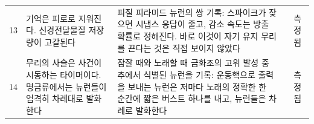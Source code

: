 {\begin{longtable}{>{\raggedright}p{0.5cm}>{\raggedright}p{4.0cm}>{\raggedright}p{5.6cm}>{\raggedright}p{2.3cm}>{\raggedright\arraybackslash}p{1.7cm}}
13 & 기억은 피로로 지워진다. 신경전달물질 저장량이 고갈된다 & 피질 피라미드 뉴런의 쌍 기록: 스파이크가 잦으면 시냅스 응답이 줄고, 감소 속도는 방출 확률로 정해진다. 바로 이것이 자기 유지 무리를 끈다는 것은 직접 보이지 않았다 & \cite{Tsodyks1997} & 측정됨 \\
14 & 무리의 사슬은 사건이 시동하는 타이머이다. 명금류에서는 뉴런들이 엄격히 차례대로 발화한다 & 잠잘 때와 노래할 때 금화조의 고위 발성 중추에서 식별된 뉴런을 기록: 운동핵으로 출력을 보내는 뉴런은 저마다 노래의 정확한 한 순간에 짧은 버스트 하나를 내고, 뉴런들은 차례로 발화한다 & \cite{Hahnloser2002} & 측정됨 \\
\bottomrule
\end{longtable}}
